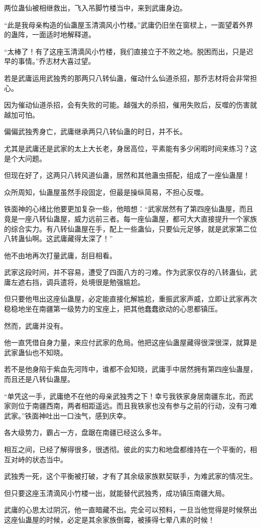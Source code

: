 \begin{this_body}
两位蛊仙被相继救出，飞入吊脚竹楼当中，来到武庸身边。

“此是我母亲构造的仙蛊屋玉清滴风小竹楼。”武庸仍旧坐在窗棂上，一面望着外界的蛊阵，一面适时地解释道。

“太棒了！有了这座玉清滴风小竹楼，我们直接立于不败之地。脱困而出，只是迟早的事情。”乔志材大喜过望。

若是武庸运用武独秀的那两只八转仙蛊，催动什么仙道杀招，那乔志材将会非常担心。

因为催动仙道杀招，会有失败的可能。越强大的杀招，催用失败后，反噬的伤害就越加可怕。

偏偏武独秀身亡，武庸继承两只八转仙蛊的时日，并不长。

尤其是武庸还是武家的太上大长老，身居高位，平素能有多少闲暇时间来练习？这是个大问题。

但现在好了，这两只八转风道仙蛊，居然和其他蛊虫搭配，组成了一座仙蛊屋！

众所周知，仙蛊屋虽然手段固定，但最是操纵简易，不担心反噬。

铁面神的心绪比他要更加复杂一些，他暗想：“武家居然有了第四座仙蛊屋，而且竟是一座八转仙蛊屋，威力远前三者。每一座仙蛊屋，都可大大直接提升一个家族的综合实力。有八转仙蛊屋在手，配上一些蛊仙，只要仙元足够，就是武家第二位八转蛊仙啊。这武庸藏得太深了！”

他不由地再次打量武庸，刮目相看。

武家这段时间，并不容易，遭受了四面八方的刁难。作为武家仅存的八转蛊仙，武庸左遮右挡，调兵遣将，处境很是勉强尴尬。

但只要他甩出这座仙蛊屋，必定能直接化解尴尬，重振武家声威，立即让武家再次稳稳地坐在南疆第一级势力的宝座上，把其他蠢蠢欲动的心思都镇压。

然而，武庸并没有。

他一直凭借自身力量，来应付武家的危局。他把这座仙蛊屋藏得很深很深，就算是武家蛊仙也不知晓。

若不是他身陷于紫血先河阵中，谁都不会知晓，武庸手中居然拥有第四座仙蛊屋，而且还是八转仙蛊屋。

“单凭这一手，武庸绝不在他的母亲武独秀之下！幸亏我铁家身居南疆东北，而武家则位于南疆西南，两者相距遥远。而且我铁家也没有参与之前的行动，没有刁难武家。”铁面神吐出一口浊气，感到庆幸。

各大级势力，霸占一方，盘踞在南疆已经这么多年。

相互之间，已经了解得很多，很透彻。彼此的实力和地盘都维持在一个平衡的，相互对峙的状态当中。

武独秀一死，这个平衡被打破，才有了其余级家族默契联手，为难武家的情况生。

但只要这座玉清滴风小竹楼一出，就能替代武独秀，成功镇压南疆大局。

武庸的心思太过阴沉，他一直暗藏不出。完全可以预料，一旦当他觉得是时候祭出这座仙蛊屋的时候，必定是其余家族倒霉，被揍得七晕八素的时候！

\end{this_body}


